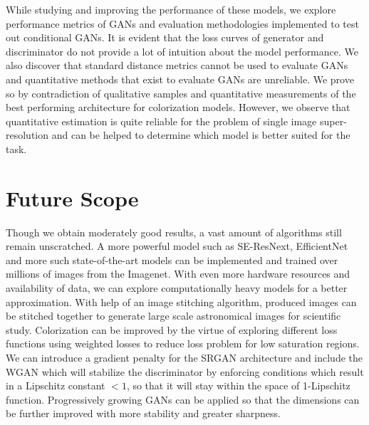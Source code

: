 \documentclass[10pt,twocolumn,letterpaper]{article}
\begin{document}
    \hspace*{0.167 in}While studying and improving the performance of these models, we explore performance metrics of GANs and evaluation methodologies implemented to test out conditional GANs. It is evident that the loss curves of generator and discriminator do not provide a lot of intuition about the model performance. We also discover that standard distance metrics cannot be used to evaluate GANs and quantitative methods that exist to evaluate GANs are unreliable. We prove so by contradiction of qualitative samples and quantitative measurements of the best performing architecture for colorization models. However, we observe that quantitative estimation is quite reliable for the problem of single image super-resolution and can be helped to determine which model is better suited for the task.
    
    \section{Future Scope}
    \hspace*{0.167 in}Though we obtain moderately good results, a vast amount of algorithms still remain unscratched. A more powerful model such as SE-ResNext, EfficientNet and more such state-of-the-art models can be implemented and trained over millions of images from the Imagenet. With even more hardware resources and availability of data, we can explore computationally heavy models for a better approximation. With help of an image stitching algorithm, produced images can be stitched together to generate large scale astronomical images for scientific study. Colorization can be improved by the virtue of exploring different loss functions using weighted losses to reduce loss problem for low saturation regions. We can introduce a gradient penalty for the SRGAN architecture and include the WGAN \cite{arjovsky2017wasserstein} which will stabilize the discriminator by enforcing conditions which result in a Lipschitz constant $<1$, so that it will stay within the space of 1-Lipschitz function. Progressively growing GANs \cite{karras2018progressive} can be applied so that the dimensions can be further improved with more stability and greater sharpness.

{\small


}
\end{document}
